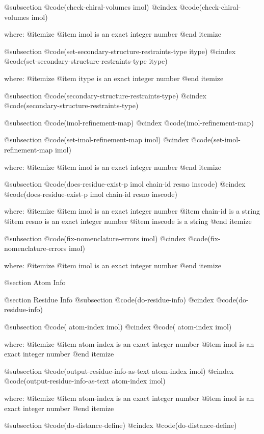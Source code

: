 @subsection @code{(check-chiral-volumes imol)}
@cindex @code{(check-chiral-volumes imol)}
 
where: 
 @itemize 
     @item imol is an exact integer number
 @end itemize


@subsection @code{(set-secondary-structure-restraints-type itype)}
@cindex @code{(set-secondary-structure-restraints-type itype)}
 
where: 
 @itemize 
     @item itype is an exact integer number
 @end itemize


@subsection @code{(secondary-structure-restraints-type)}
@cindex @code{(secondary-structure-restraints-type)}
 
@subsection @code{(imol-refinement-map)}
@cindex @code{(imol-refinement-map)}
 
@subsection @code{(set-imol-refinement-map imol)}
@cindex @code{(set-imol-refinement-map imol)}
 
where: 
 @itemize 
     @item imol is an exact integer number
 @end itemize


@subsection @code{(does-residue-exist-p imol chain-id resno inscode)}
@cindex @code{(does-residue-exist-p imol chain-id resno inscode)}
 
where: 
 @itemize 
     @item imol is an exact integer number
     @item chain-id is a string
     @item resno is an exact integer number
     @item inscode is a string
 @end itemize


@subsection @code{(fix-nomenclature-errors imol)}
@cindex @code{(fix-nomenclature-errors imol)}
 
where: 
 @itemize 
     @item imol is an exact integer number
 @end itemize



@section Atom Info 

@section Residue Info 
@subsection @code{(do-residue-info)}
@cindex @code{(do-residue-info)}
 
@subsection @code{( atom-index imol)}
@cindex @code{( atom-index imol)}
 
where: 
 @itemize 
     @item atom-index is an exact integer number
     @item imol is an exact integer number
 @end itemize


@subsection @code{(output-residue-info-as-text atom-index imol)}
@cindex @code{(output-residue-info-as-text atom-index imol)}
 
where: 
 @itemize 
     @item atom-index is an exact integer number
     @item imol is an exact integer number
 @end itemize


@subsection @code{(do-distance-define)}
@cindex @code{(do-distance-define)}
 
